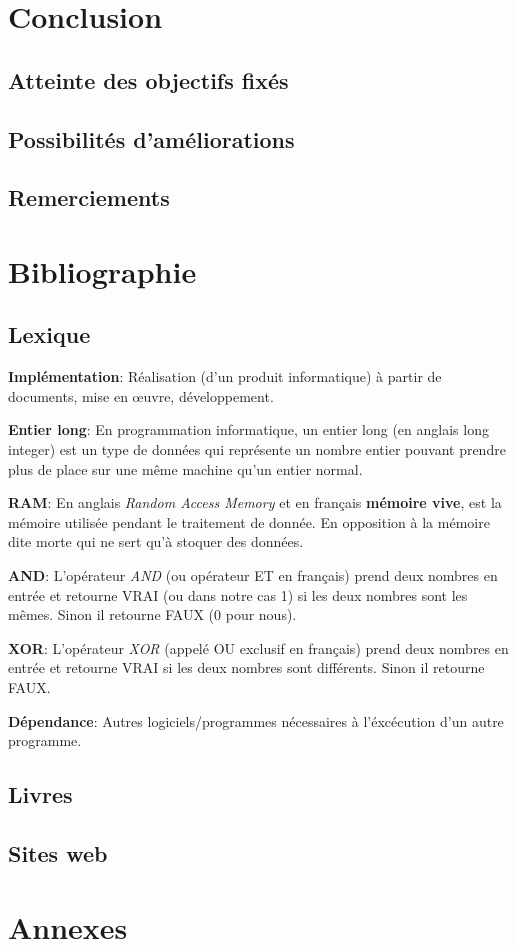 \documentclass[a4paper]{article}
\newcommand{\lexique}[2]{\item{\textbf{#1}:} #2}
\begin{document}
\section{Conclusion}
\subsection{Atteinte des objectifs fixés}
\subsection{Possibilités d'améliorations}
\subsection{Remerciements}

\newpage
\section{Bibliographie}
\subsection{Lexique}
    \begin{description}
        \lexique{Implémentation}{Réalisation (d’un produit informatique) à partir de documents, mise en œuvre, développement.}
        \lexique{Entier long}{En programmation informatique, un entier long (en anglais long integer) est un type de données qui représente un nombre entier pouvant prendre plus de place sur une même machine qu'un entier normal.}
        \lexique{RAM}{En anglais \textit{Random Access Memory} et en français \textbf{mémoire vive}, est la mémoire utilisée pendant le traitement de donnée. En opposition à la mémoire dite morte qui ne sert qu'à stoquer des données.}
        \lexique{AND}{L'opérateur \textit{AND} (ou opérateur ET en français) prend deux nombres en entrée et retourne VRAI (ou dans notre cas 1) si les deux nombres sont les mêmes. Sinon il retourne FAUX (0 pour nous).}
        \lexique{XOR}{L'opérateur \textit{XOR} (appelé OU exclusif en français) prend deux nombres en entrée et retourne VRAI si les deux nombres sont différents. Sinon il retourne FAUX.}
	    \lexique{Dépendance}{Autres logiciels/programmes nécessaires à l'éxcécution d'un autre programme.}
    \end{description}
\subsection{Livres}
\printbibliography[heading=none, type=book]
\subsection{Sites web}
\printbibliography[heading=none, type=misc]

\section{Annexes}
\end{document}
